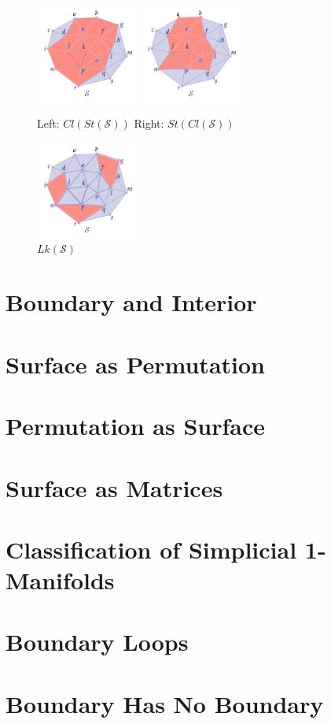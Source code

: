 \begin{figure}[h]
    \centering
    \includegraphics[width=0.3\textwidth]{figures/A0/ex8-cl-st.png}
    \includegraphics[width=0.3\textwidth]{figures/A0/ex8-st-cl.png}
    \caption{Left: $Cl(St(\mathcal S))$ Right: $St(Cl(\mathcal S))$}
    \label{fig:ex8-cl-st}
\end{figure}

\begin{figure}[h]
    \centering
    \includegraphics[width=0.3\textwidth]{figures/A0/ex8-lk.png}
    \caption{$Lk(\mathcal S)$}
    \label{fig:ex8-lk}
\end{figure}

\section{Boundary and Interior}

\section{Surface as Permutation}

\section{Permutation as Surface}

\section{Surface as Matrices}

\section{Classiﬁcation of Simplicial 1-Manifolds}

\section{Boundary Loops}

\section{Boundary Has No Boundary}

